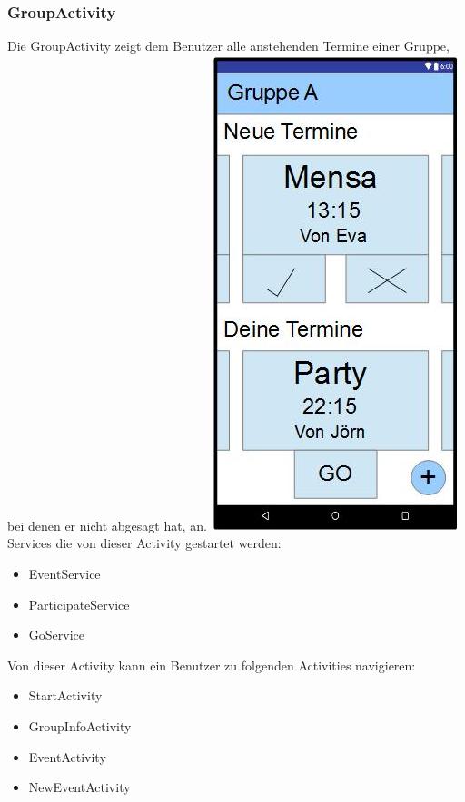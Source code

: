 	\subsubsection {GroupActivity}
	Die GroupActivity zeigt dem Benutzer alle anstehenden Termine einer Gruppe, bei denen er nicht abgesagt hat, an.
	\newline
	\includegraphics[width=.3\textwidth]{GUI_Group.jpg}
	\newline
	Services die von dieser Activity gestartet werden:
	\begin{itemize}
	\item EventService
	\item ParticipateService
	\item GoService
	\end{itemize}
	Von dieser Activity kann ein Benutzer zu folgenden Activities navigieren:
	\begin{itemize} 
	 \item StartActivity
	 \item GroupInfoActivity
	 \item EventActivity
	 \item NewEventActivity
	\end{itemize} 
	\newpage
